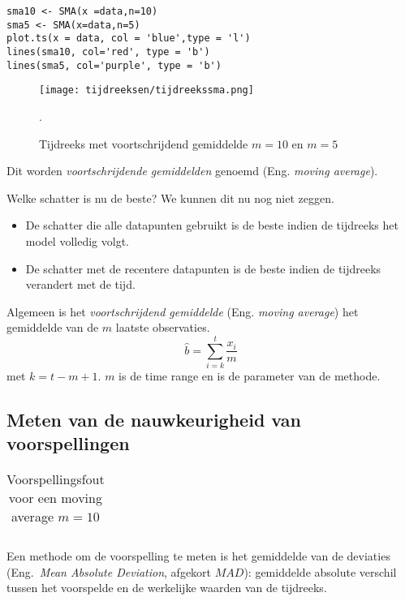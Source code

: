 \begin{lstlisting}
sma10 <- SMA(x =data,n=10)
sma5 <- SMA(x=data,n=5)
plot.ts(x = data, col = 'blue',type = 'l')
lines(sma10, col='red', type = 'b')
lines(sma5, col='purple', type = 'b')
\end{lstlisting}

\begin{figure}
\centering
	\texttt{[image: tijdreeksen/tijdreekssma.png]}
	\caption{Tijdreeks met voortschrijdend gemiddelde $m = 10$ en $m=5$}. 
\label{fig:tijdreeks31}
\end{figure}

Dit worden \textit{voortschrijdende gemiddelden} genoemd (Eng. \emph{moving average}). 

Welke schatter is nu de beste? We kunnen dit nu nog niet zeggen.

\begin{itemize}
\item De schatter die alle datapunten gebruikt is de beste indien de tijdreeks het model volledig volgt.
\item De schatter met de recentere datapunten is de beste indien de tijdreeks verandert met de tijd.
\end{itemize}

\begin{definition}
Algemeen is het \emph{voortschrijdend gemiddelde} (Eng. \emph{moving average}) het gemiddelde van de $m$ laatste observaties.
\begin{equation}
	\widehat{b} = \sum_{i=k}^{t} \frac{x_{i}}{m}
\label{eq:movingAverage}
\end{equation}
met $k = t-m+1$. $m$ is de time range en is de parameter van de methode.
\end{definition}

\subsection{Meten van de nauwkeurigheid van voorspellingen}

\begin{table}
  \centering
\begin{tabular}{|lllllllllll|}

\end{tabular}
\caption{Voorspellingsfout voor een moving average $m = 10$}
\label{tab:error}
\end{table}


Een methode om de voorspelling te meten is het gemiddelde van de deviaties (Eng.~\emph{Mean Absolute Deviation}, afgekort $MAD$): gemiddelde absolute verschil tussen het voorspelde en de werkelijke waarden van de tijdreeks.

